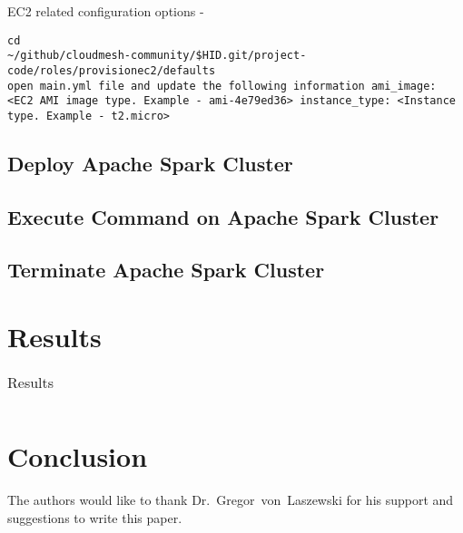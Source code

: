 EC2 related configuration options -

\begin{verbatim}
cd
~/github/cloudmesh-community/$HID.git/project-code/roles/provisionec2/defaults
open main.yml file and update the following information ami_image:
<EC2 AMI image type. Example - ami-4e79ed36> instance_type: <Instance
type. Example - t2.micro>
\end{verbatim}

\subsection{Deploy Apache Spark Cluster}


\subsection{Execute Command on Apache Spark Cluster}


\subsection{Terminate Apache Spark Cluster}


\section{Results}

\begin{table}[hbt]
	\centering \caption{Results}\label{t:results-table} \begin{tabular}{llll} \end{tabular}
\end{table}


\section{Conclusion}



\begin{acks}

  The authors would like to thank Dr.~Gregor~von~Laszewski for his
  support and suggestions to write this paper.

\end{acks}


 

